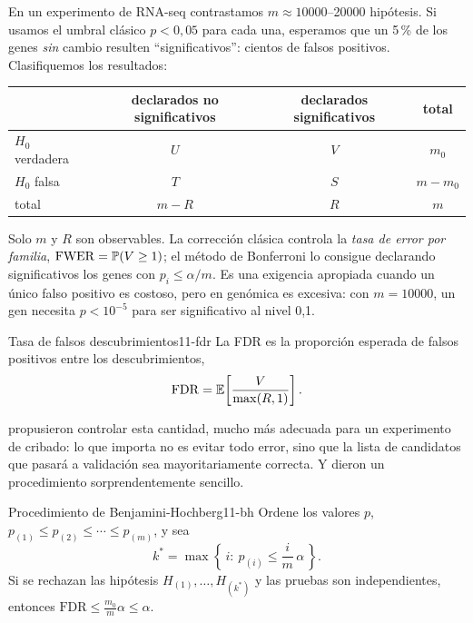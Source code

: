 En un experimento de RNA-seq contrastamos $m\approx\num{10000}$--\num{20000} hipótesis. Si usamos el umbral clásico $p<0{,}05$ para cada una, esperamos que un 5\,\% de los genes \emph{sin} cambio resulten ``significativos'': cientos de falsos positivos. Clasifiquemos los resultados:
\begin{center}\small
\begin{tabular}{@{}lccc@{}}
\toprule
 & declarados no significativos & declarados significativos & total\\
\midrule
$H_0$ verdadera & $U$ & $V$ & $m_0$\\
$H_0$ falsa & $T$ & $S$ & $m-m_0$\\
total & $m-R$ & $R$ & $m$\\
\bottomrule
\end{tabular}
\end{center}
Solo $m$ y $R$ son observables. La corrección clásica controla la \emph{tasa de error por familia}, $\mathrm{FWER}=\mathbb{P}(V\ge1)$; el método de Bonferroni lo consigue declarando significativos los genes con $p_i\le\alpha/m$. Es una exigencia apropiada cuando un único falso positivo es costoso, pero en genómica es excesiva: con $m=\num{10000}$, un gen necesita $p<10^{-5}$ para ser significativo al nivel 0,1.

\begin{definicion}{Tasa de falsos descubrimientos}{11-fdr}
La FDR es la proporción esperada de falsos positivos entre los descubrimientos,
\begin{equation}\label{eq:11-fdr}
\mathrm{FDR}=\mathbb{E}\!\left[\frac{V}{\max(R,1)}\right].
\end{equation}
\end{definicion}

\begin{simbolos}
\end{simbolos}

\textcite{c11-benjamini1995} propusieron controlar esta cantidad, mucho más adecuada para un experimento de cribado: lo que importa no es evitar todo error, sino que la lista de candidatos que pasará a validación sea mayoritariamente correcta. Y dieron un procedimiento sorprendentemente sencillo.

\begin{teorema}{Procedimiento de Benjamini-Hochberg}{11-bh}
Ordene los valores $p$, $p_{(1)}\le p_{(2)}\le\cdots\le p_{(m)}$, y sea
\begin{equation}\label{eq:11-bh}
k^{*}=\max\left\{\,i:\ p_{(i)}\le\frac{i}{m}\,\alpha\,\right\}.
\end{equation}
Si se rechazan las hipótesis $H_{(1)},\dots,H_{(k^*)}$ y las pruebas son independientes, entonces $\mathrm{FDR}\le\frac{m_0}{m}\alpha\le\alpha$.
\end{teorema}

